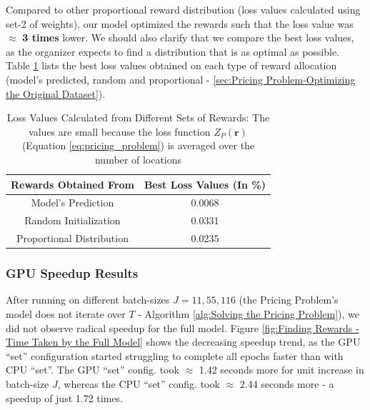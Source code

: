 \documentclass[12pt]{article}
\newcommand{\vect}[1]{\mathbf{#1}}  %
\begin{document}
    Compared to other proportional reward distribution (loss values calculated using set-2 of weights), our model optimized the rewards such that the loss value was $\approx$ \textbf{3 times} lower. We should also clarify that we compare the best loss values, as the organizer expects to find a distribution that is as optimal as possible. Table \ref{tab:Loss Values Calculated from Different Sets of Rewards} lists the best loss values obtained on each type of reward allocation (model's predicted, random and proportional - \cref{sec:Pricing Problem-Optimizing the Original Dataset}).
    \begin{table}[!htbp]
        \centering
        \caption[Loss Values Calculated from Different Sets of Rewards]{Loss Values Calculated from Different Sets of Rewards: The values are small because the loss function $Z_P(\vect{r})$ (Equation \ref{eq:pricing_problem}) is averaged over the number of locations}
        \label{tab:Loss Values Calculated from Different Sets of Rewards}
        \begin{tabular}{|c|c|}
            \hline
            \textbf{Rewards Obtained From} & \textbf{Best Loss Values (In \%)}\\
            \hline
            Model's Prediction & 0.0068\\
            Random Initialization & 0.0331\\
            Proportional Distribution & 0.0235\\
            \hline
        \end{tabular}
    \end{table}
    
    \subsubsection{GPU Speedup Results} \label{sec:PriProbRes - GPU}
    After running on different batch-sizes $J = 11, 55, 116$ (the Pricing Problem's model does not iterate over $T$ - Algorithm \ref{alg:Solving the Pricing Problem}), we did not observe radical speedup for the full model. Figure \ref{fig:Finding Rewards - Time Taken by the Full Model} shows the decreasing speedup trend, as the GPU ``set'' configuration started struggling to complete all epochs faster than with CPU ``set''. The GPU ``set'' config. took $\approx$ 1.42 seconds more for unit increase in batch-size $J$, whereas the CPU ``set'' config. took $\approx$ 2.44 seconds more - a speedup of just 1.72 times.
    
\end{document}
